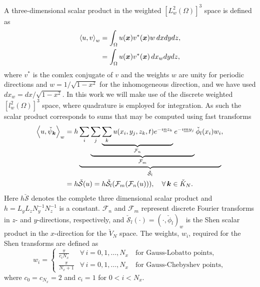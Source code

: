 \documentclass[11pt, oneside]{article}
\newcommand{\N}[1]{\check{#1}}
\begin{document}
A three-dimensional scalar product in the weighted $[L^2_w(\Omega)]^3$ space is defined as
\begin{align}
 \left<u, v\right>_w &= \int_{\Omega} {u(\bm{x}) v^*(\bm{x})}w\,dxdydz, \notag \\
   &= \int_{\Omega} {u(\bm{x}) v^*(\bm{x})}\,dx_wdydz,
\end{align}
where $v^*$ is the comlex conjugate of $v$ and the weights $w$ are unity for periodic directions and  $w=1/\sqrt{1-x^2}$ for the inhomogeneous direction, and we have used $dx_w = dx/\sqrt{1-x^2}$. In this work we will make use of the discrete weighted $[l^2_w(\Omega)]^3$ space, where quadrature is employed for integration. As such the scalar product corresponds to sums that may be computed using fast transforms
\begin{align}
 \left< u, \N{\psi}_{\bm{k}} \right>_w &= h \underbrace{\sum_i 
 \underbrace{\sum_j \underbrace{\sum_k u(x_i, y_j, z_k, t)  e^{-\imath 
 \underline{n} z_k}}_{\mathcal{F}_n}  e^{-\imath \underline{m} y_j} 
 }_{\mathcal{F}_m} \N{\phi}_{l}(x_i) w_i}_{\N{\mathcal{S}}_l},   \notag \\
  &=  h \N{\mathcal{S}}(u) = h \N{\mathcal{S}}_{l} (\mathcal{F}_{{m}} 
  (\mathcal{F}_{{n}}(u))), \quad \forall \, \bm{k} \in \N{K}_N. \label{eq:sst1}
\end{align}
Here $h\N{\mathcal{S}}$ denotes the complete three dimensional scalar product 
and $h = L_yL_zN_y^{-1}N_z^{-1}$ is a constant. $\mathcal{F}_{{n}}$ and 
$\mathcal{F}_{{m}}$ represent discrete Fourier transforms in $z$- and 
$y$-directions, respectively, and $\N{\mathcal{S}}_{l}(\cdot) = (\cdot, 
\N{\phi}_l)_w$ is the Shen scalar product in the $x$-direction for the 
$\N{V}_N$ space. The weights, $w_i$, required for the Shen transforms are 
defined as
\begin{equation}
 w_i = \begin{cases}
       \frac{\pi}{c_i N_x} &\forall \, i=0,1,\ldots, N_x \quad  \text{for 
       Gauss-Lobatto points},\\
       \frac{\pi}{N_x+1} &\forall \, i=0,1,\ldots, N_x  \quad \text{for 
       Gauss-Chebyshev points},      
 \end{cases}
\end{equation}
where $c_0 = c_{N_x} = 2$ and $c_i = 1$ for $0 < i < N_x$.
\end{document}
